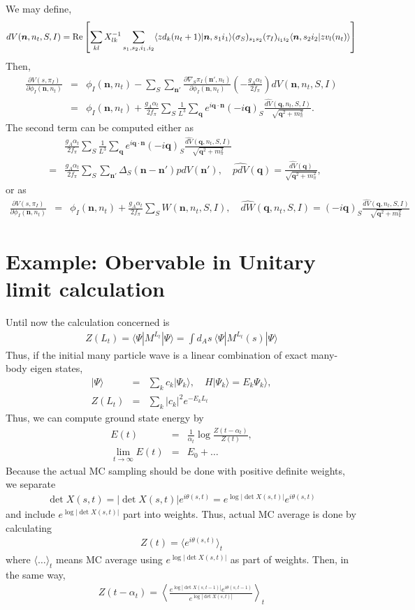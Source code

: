 \documentclass[10pt]{book}
\def\bm{\boldsymbol}
\newcommand{\bea}{\begin{eqnarray}}
\newcommand{\eea}{\end{eqnarray}}
\newcommand{\no}{\nonumber \\}
\newcommand{\del}{\partial}
\def\vn{{\bm n}}
\def\vq{{\bm q}}
\def\la{\langle}
\def\ra{\rangle}
\begin{document}
We may define,
\bea 
dV(\vn,n_t,S,I)=
{\rm Re}\left[ \sum_{kl} X^{-1}_{lk} 
   \sum_{s_1,s_2,i_1,i_2}
 \la zd_k(n_t+1)|\vn,s_1 i_1\ra (\sigma_S)_{s_1 s_2}(\tau_I)_{i_1 i_2} \la \vn, s_2 i_2| zv_l (n_t)\ra  
\right] 
\eea 
Then,
\bea 
\frac{\del V(s,\pi_I)}{\del \phi_I(\vn,n_t)}&=&\phi_I(\vn,n_t)
 -\sum_{S}\sum_{\vn'}\frac{\del \nabla_S\pi_I(\vn',n_t)}{\del \phi_I(\vn,n_t)} (-\frac{g_A\alpha_t}{2f_\pi})dV(\vn,n_t,S,I) \no 
 &=& \phi_I(\vn,n_t)
 +\frac{g_A\alpha_t}{2f_\pi} \sum_{S} 
  \frac{1}{L^3}\sum_\vq e^{i\vq\cdot\vn}(-i\vq)_S \frac{ \widehat{dV}(\vq,n_t,S,I)}{\sqrt{\vq^2+m_\pi^2}}. 
\eea 
The second term can be computed either as
\bea 
& &\frac{g_A\alpha_t}{2f_\pi} \sum_{S} 
\frac{1}{L^3}\sum_\vq e^{i\vq\cdot\vn}(-i\vq)_S \frac{ \widehat{dV}(\vq,n_t,S,I)}{\sqrt{\vq^2+m_\pi^2}} \no 
 &=& \frac{g_A\alpha_t}{2f_\pi} \sum_{S}\sum_{\vn'} \Delta_S(\vn-\vn') pdV(\vn'),
 \quad \widehat{pdV}(\vq)=\frac{\widehat{dV}(\vq)}{\sqrt{\vq^2+m_\pi^2}},
\eea 
or as 
\bea 
\frac{\del V(s,\pi_I)}{\del \phi_I(\vn,n_t)}&=&\phi_I(\vn,n_t)+\frac{g_A\alpha_t}{2f_\pi}\sum_{S}W(\vn,n_t,S,I),
\quad \widehat{dW}(\vq,n_t,S,I) = (-i\vq)_S \frac{ \widehat{dV}(\vq,n_t,S,I)}{\sqrt{\vq^2+m_\pi^2}} 
\nonumber 
\eea 


\section{Example: Obervable in Unitary limit calculation }
Until now the calculation concerned is
\bea 
Z(L_t) =\la \Psi| M^{L_t}|\Psi\ra =\int d_A s\ \la \Psi| M^{L_t}(s)|\Psi\ra
\eea 
Thus, if the initial many particle wave is a linear combination of 
exact many-body eigen states,
\bea 
|\Psi\ra&=&\sum_{k} c_k |\Psi_k\ra, \quad H|\Psi_k\ra=E_k\Psi_k\ra,\no   
Z(L_t)&=& \sum_{k} |c_k|^2 e^{-E_k L_t}
\eea 
Thus, we can compute ground state energy by 
\bea 
E(t)&=&\frac{1}{\alpha_t}\log\frac{Z(t-\alpha_t)}{Z(t)},\no 
\lim_{t\to \infty} E(t) &= & E_{0}+\dots   
\eea 
Because the actual MC sampling should be done with positive definite weights,
we separate 
\bea 
\det X(s,t)=|\det X(s,t)|e^{i\theta(s,t)}=e^{\log|\det X(s,t)|}e^{i\theta(s,t)}
\eea 
and include $e^{\log|\det X(s,t)|}$ part into weights. 
Thus, actual MC average is done by calculating
\bea 
Z(t)=\la e^{i\theta(s,t)} \ra_{t}
\eea 
where $\la \dots\ra_t$ means MC average using  $e^{\log|\det X(s,t)|}$
as part of weights.
Then, in the same way,
\bea 
Z(t-\alpha_t)
=\left\la \frac{e^{\log|\det X(s,t-1)|}
              e^{i\theta(s,t-1)}}{e^{\log|\det X(s,t)|}}\right \ra_t
\eea 
\end{document}
